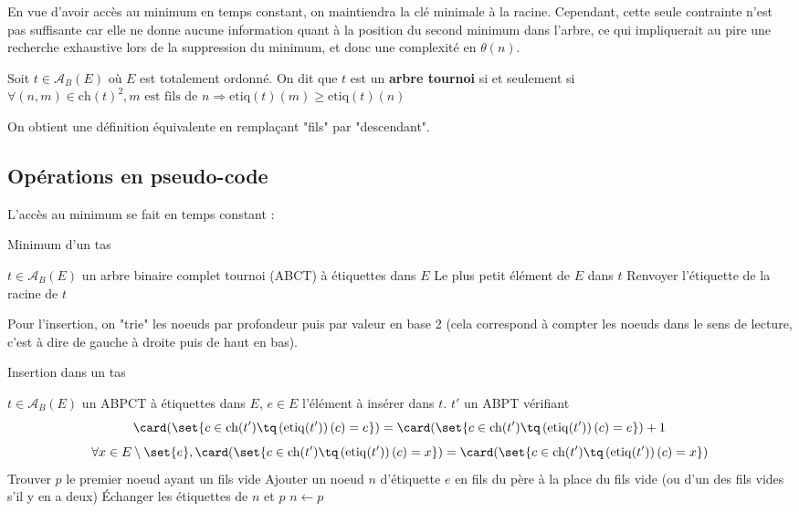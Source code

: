 \documentclass{scrartcl}
\begin{document}
		En vue d’avoir accès au minimum en temps constant, on maintiendra la clé minimale à la racine. Cependant, cette seule contrainte n’est pas suffisante car elle ne donne aucune information quant à la position du second minimum dans l’arbre, ce qui impliquerait au pire une recherche exhaustive lors de la suppression du minimum, et donc une complexité en $\theta(n)$. 		

		Soit $t \in \mathscr{A}_B(E)$ où $E$ est totalement ordonné. On dit que $t$ est un \textbf{arbre tournoi} si et seulement si
		$\forall (n, m) \in \mathrm{ch}(t)^2, m \text{ est fils de } n \Rightarrow  \mathrm{etiq}(t)(m) \geq \mathrm{etiq}(t)(n)$
		
		\rem On obtient une définition équivalente en remplaçant "fils" par "descendant".

		\subsection{Opérations en pseudo-code}
			L'accès au minimum se fait en temps constant : 

			\begin{algorithm}[H]
					\caption{Minimum d'un tas}
					\Entree
					{
						$t \in \mathscr{A}_B(E)$ un arbre binaire complet tournoi (ABCT) à étiquettes dans $E$
					}
					\Sortie
					{
						Le plus petit élément de $E$ dans $t$
					}
					Renvoyer l'étiquette de la racine de $t$
			\end{algorithm}

			Pour l'insertion, on "trie" les noeuds par profondeur puis par valeur en base 2 (cela correspond à compter les noeuds dans le sens de lecture, c'est à dire de gauche à droite puis de haut en bas).

			\begin{algorithm}[H]
				\caption{Insertion dans un tas}
				\Entree
				{
					$t \in \mathscr{A}_B(E)$ un ABPCT à étiquettes dans $E$, 
					$e \in E$ l'élément à insérer dans $t$.
				}
				\Sortie
				{
					$t'$ un ABPT vérifiant 
					\[
						\card(\set{c \in \mathrm{ch}(t') \tq \left(\mathrm{etiq}(t')\right)(c) = e}) = \card(\set{c \in \mathrm{ch}(t') \tq \left(\mathrm{etiq}(t')\right)(c) = e}) + 1
					\] 
					\[
						\forall x \in E\setminus\set{e}, \card(\set{c \in \mathrm{ch}(t') \tq \left(\mathrm{etiq}(t')\right)(c) = x}) = \card(\set{c \in \mathrm{ch}(t') \tq \left(\mathrm{etiq}(t')\right)(c) = x})
					\]
				}
					Trouver $p$ le premier noeud ayant un fils vide \;
					Ajouter un noeud $n$ d'étiquette $e$ en fils du père à la place du fils vide (ou d'un des fils vides s'il y en a deux) \;
					{
						Échanger les étiquettes de $n$ et $p$ \;
						$n \leftarrow p$
					}
			\end{algorithm}
\end{document}
